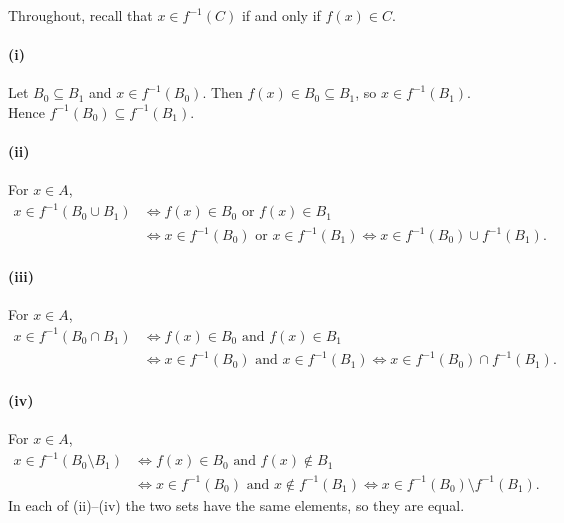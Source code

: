 
Throughout, recall that $x\in f^{-1}(C)$ if and only if $f(x)\in C$.

\paragraph{(i)} Let $B_0\subseteq B_1$ and $x\in f^{-1}(B_0)$. Then $f(x)\in B_0\subseteq B_1$,
so $x\in f^{-1}(B_1)$. Hence $f^{-1}(B_0)\subseteq f^{-1}(B_1)$.

\paragraph{(ii)} For $x\in A$,
\begin{align*}
x\in f^{-1}(B_0\cup B_1)
&\iff f(x)\in B_0 \text{ or } f(x)\in B_1\\
&\iff x\in f^{-1}(B_0) \text{ or } x\in f^{-1}(B_1)
\iff x\in f^{-1}(B_0)\cup f^{-1}(B_1).
\end{align*}

\paragraph{(iii)} For $x\in A$,
\begin{align*}
x\in f^{-1}(B_0\cap B_1)
&\iff f(x)\in B_0 \text{ and } f(x)\in B_1\\
&\iff x\in f^{-1}(B_0) \text{ and } x\in f^{-1}(B_1)
\iff x\in f^{-1}(B_0)\cap f^{-1}(B_1).
\end{align*}

\paragraph{(iv)} For $x\in A$,
\begin{align*}
x\in f^{-1}(B_0\setminus B_1)
&\iff f(x)\in B_0 \text{ and } f(x)\notin B_1\\
&\iff x\in f^{-1}(B_0) \text{ and } x\notin f^{-1}(B_1)
\iff x\in f^{-1}(B_0)\setminus f^{-1}(B_1).
\end{align*}
In each of (ii)--(iv) the two sets have the same elements, so they are equal.
